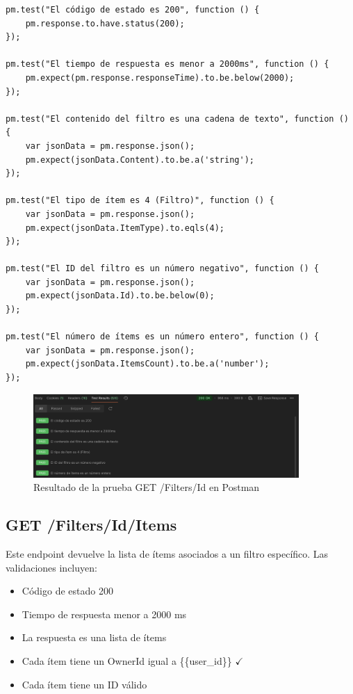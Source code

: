 \documentclass{report}
\begin{document}
\begin{lstlisting}
pm.test("El código de estado es 200", function () {
    pm.response.to.have.status(200);
});

pm.test("El tiempo de respuesta es menor a 2000ms", function () {
    pm.expect(pm.response.responseTime).to.be.below(2000);
});

pm.test("El contenido del filtro es una cadena de texto", function () {
    var jsonData = pm.response.json();
    pm.expect(jsonData.Content).to.be.a('string');
});

pm.test("El tipo de ítem es 4 (Filtro)", function () {
    var jsonData = pm.response.json();
    pm.expect(jsonData.ItemType).to.eqls(4);
});

pm.test("El ID del filtro es un número negativo", function () {
    var jsonData = pm.response.json();
    pm.expect(jsonData.Id).to.be.below(0);
});

pm.test("El número de ítems es un número entero", function () {
    var jsonData = pm.response.json();
    pm.expect(jsonData.ItemsCount).to.be.a('number');
});
\end{lstlisting}
\begin{figure}[h!]
    \centering
    \includegraphics[width=0.9\textwidth]{./imgs/tc1postman.png}
    \caption{Resultado de la prueba GET /Filters/Id en Postman}
    \label{fig:tc1postman} 
\end{figure}


\subsection{GET /Filters/Id/Items}
Este endpoint devuelve la lista de ítems asociados a un filtro específico. Las validaciones incluyen:
\begin{itemize}
    \item Código de estado 200 \checkmark
    \item Tiempo de respuesta menor a 2000 ms \checkmark
    \item La respuesta es una lista de ítems \checkmark
    \item Cada ítem tiene un OwnerId igual a \{\{user\_id\}\} $\checkmark$
    \item Cada ítem tiene un ID válido \checkmark
\end{itemize}
\end{document}
